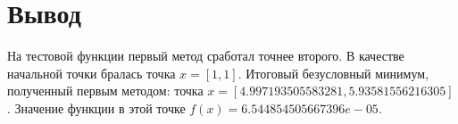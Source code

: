 \section{Вывод}
    На тестовой функции первый метод сработал точнее второго.
    В качестве начальной точки бралась точка $x = [1, 1]$.
    Итоговый безусловный минимум, полученный первым методом:
    точка $x = [4.997193505583281, 5.93581556216305]$.
    Значение функции в этой точке $f(x) = 6.544854505667396e-05$.